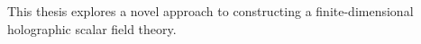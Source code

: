 \begin{abstract_thesis}
    This thesis explores a novel approach to constructing a finite-dimensional holographic scalar field theory.
\end{abstract_thesis}
